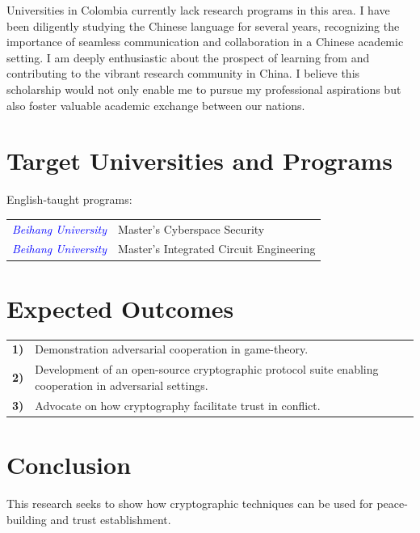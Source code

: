 \documentclass[conference]{IEEEtran}
\begin{document}
Universities in Colombia currently lack research programs in this area. I have been diligently studying the Chinese language for several years, 
recognizing the importance of seamless communication and collaboration in a Chinese academic setting. 
I am deeply enthusiastic about the prospect of learning from and contributing to the vibrant research community in China. 
I believe this scholarship would not only enable me to pursue my professional aspirations but also foster valuable academic exchange between our nations.

\section{Target Universities and Programs}
\vspace{5pt}
{\small English-taught programs:} \\

\begin{tabular}{rl}
    \textcolor{blue}{\small\textit{Beihang University}} & {\small Master's Cyberspace Security}\\
    \textcolor{blue}{\small\textit{Beihang University}} & {\small Master's Integrated Circuit Engineering}
\end{tabular}

\section{Expected Outcomes}

\begin{tabular}{lp{210pt}}
    {\small \textbf{1)}} & {\small Demonstration adversarial cooperation in game-theory.} \\
    {\small \textbf{2)}} & {\small Development of an open-source cryptographic protocol suite enabling cooperation in adversarial settings.} \\
    {\small \textbf{3)}} & {\small Advocate on how cryptography facilitate trust in conflict.}
\end{tabular}

\section{Conclusion}
This research seeks to show how cryptographic techniques can be used for peace-building and trust establishment. 
\end{document}
